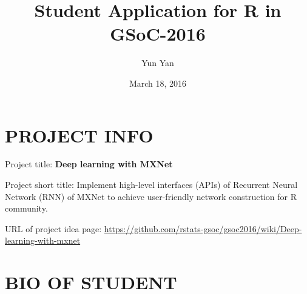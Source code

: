 \documentclass[]{article}
\title{Student Application for R in GSoC-2016}
\author{Yun Yan}
\date{March 18, 2016}
\begin{document}
\maketitle

\section{PROJECT INFO}\label{project-info}

Project title: \textbf{Deep learning with MXNet}

Project short title: Implement high-level interfaces
(APIs) of Recurrent Neural Network (RNN) of MXNet to achieve
user-friendly network construction for R community.

URL of project idea page:
\url{https://github.com/rstats-gsoc/gsoc2016/wiki/Deep-learning-with-mxnet}

\section{BIO OF STUDENT}\label{bio-of-student}
\end{document}
